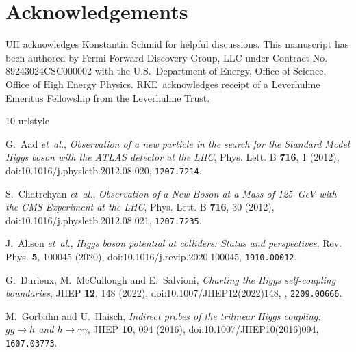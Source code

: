 \documentclass{SciPost}
\begin{document}
\section*{Acknowledgements}
UH acknowledges Konstantin Schmid for helpful discussions. This manuscript has been authored by Fermi Forward Discovery Group, LLC under Contract No. 89243024CSC000002 with the U.S.\ Department of Energy, Office of Science, Office of High Energy Physics. RKE~acknowledges receipt of a Leverhulme Emeritus Fellowship from the Leverhulme Trust.

%
%

\begin{thebibliography}{10}
\providecommand{\url}[1]{\texttt{#1}}
\providecommand{\urlprefix}{URL }
\expandafter\ifx\csname urlstyle\endcsname\relax
  \providecommand{\doi}[1]{doi:\discretionary{}{}{}#1}\else
  \providecommand{\doi}{doi:\discretionary{}{}{}\begingroup \urlstyle{rm}\Url}\fi
\providecommand{\eprint}[2][]{\url{#2}}

G.~Aad \emph{et~al.},
\newblock \emph{{Observation of a new particle in the search for the Standard Model Higgs boson with the ATLAS detector at the LHC}},
\newblock Phys. Lett. B \textbf{716}, 1 (2012),
\newblock \doi{10.1016/j.physletb.2012.08.020},
\newblock \eprint{1207.7214}.

S.~Chatrchyan \emph{et~al.},
\newblock \emph{{Observation of a New Boson at a Mass of 125~GeV with the CMS Experiment at the LHC}},
\newblock Phys. Lett. B \textbf{716}, 30 (2012),
\newblock \doi{10.1016/j.physletb.2012.08.021},
\newblock \eprint{1207.7235}.

J.~Alison \emph{et~al.},
\newblock \emph{{Higgs boson potential at colliders: Status and perspectives}},
\newblock Rev. Phys. \textbf{5}, 100045 (2020),
\newblock \doi{10.1016/j.revip.2020.100045},
\newblock \eprint{1910.00012}.

G.~Durieux, M.~McCullough and E.~Salvioni,
\newblock \emph{{Charting the Higgs self-coupling boundaries}},
\newblock JHEP \textbf{12}, 148 (2022),
\newblock \doi{10.1007/JHEP12(2022)148},
,
\newblock \eprint{2209.00666}.

M.~Gorbahn and U.~Haisch,
\newblock \emph{{Indirect probes of the trilinear Higgs coupling: $gg \to h$ and $h \to \gamma \gamma$}},
\newblock JHEP \textbf{10}, 094 (2016),
\newblock \doi{10.1007/JHEP10(2016)094},
\newblock \eprint{1607.03773}.


\end{thebibliography}
\end{document}
